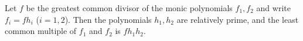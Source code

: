 Let $f$ be the greatest common divisor of the monic polynomials $f_1, f_2$ and write $f_i = f h_i$ ($i = 1, 2$). Then the polynomials $h_1, h_2$ are relatively prime, and the least common multiple of $f_1$ and $f_2$ is $f h_1 h_2$.
